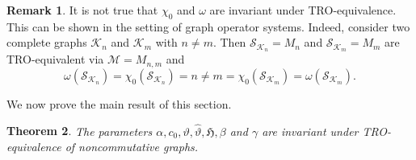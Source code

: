 \documentclass[11pt]{amsart}
\numberwithin{equation}{section}
\theoremstyle{plain}
\newtheorem{theorem}{Theorem}[section]
\theoremstyle{definition}
\newtheorem{remark}[theorem]{Remark}
\theoremstyle{remark}
\newcommand{\K}{{\mathcal{K}}}
\newcommand{\M}{{\mathcal{M}}}
\renewcommand{\S}{{\mathcal{S}}}
\def\ga{\gamma}
\newcommand{\fH}{{\mathfrak{H}}}
\newcommand{\wh}{\widehat}
\begin{document}
\begin{remark}\label{R:chrqli}
It is not true that $\chi_{0}$ and $\omega$ are invariant under TRO-equivalence. This can be shown in the setting of graph operator systems. Indeed, consider two complete graphs $\K_n$ and $\K_m$ with $n\neq m$. Then $\S_{\K_n}=M_n$ and $\S_{\K_m}=M_m$ are TRO-equivalent via $\M=M_{n,m}$ and
\[
\omega(\S_{\K_n})=\chi_{0}(\S_{\K_n}) = n\neq m = \chi_{0}(\S_{\K_m})=\omega(\S_{\K_m}).
\] 
\end{remark}

We now prove the main result of this section. 

\begin{theorem}\label{th:nc_graph_parameter_invariance}
The parameters $\alpha, c_{0}, \vartheta, \wh{\vartheta}, \fH, \beta$ and $\ga$ are invariant under TRO-equivalence of noncommutative graphs.
\end{theorem}
\end{document}
